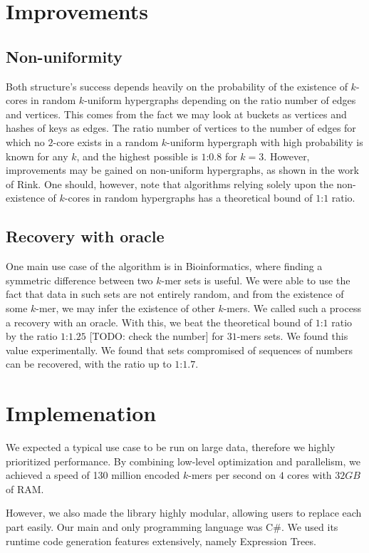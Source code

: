 \section*{Improvements}

\subsection*{Non-uniformity}
Both structure's success depends heavily on the probability of the existence of $k$-cores in random $k$-uniform hypergraphs depending on the ratio number of edges and vertices. This comes from the fact we may look at buckets as vertices 
and hashes of keys as edges. The ratio number of vertices to the number of edges for which no $2$-core exists
 in a random $k$-uniform hypergraph with high probability is known for any $k$, and the highest possible is $1$:$0.8$ for $k = 3$.\cite{DBLP:conf/soda/Molloy04}
However, improvements may be gained on non-uniform hypergraphs, as shown in the work of Rink\cite{DBLP:journals/corr/abs-1204-2131}. One should, however, note that algorithms relying solely upon 
the non-existence of $k$-cores in random hypergraphs has a theoretical bound of $1$:$1$ ratio.

\subsection*{Recovery with oracle}
One main use case of the algorithm is in Bioinformatics, where finding a symmetric difference between two $k$-mer sets is useful. 
We were able to use the fact that data in such sets are not entirely random, and from the existence of some $k$-mer, we may infer the existence of other $k$-mers. We called such a process a recovery with 
an oracle. With this, we beat the theoretical bound of $1$:$1$ ratio by the ratio $1$:$1.25$ [TODO: check the number] for $31$-mers sets. We found this value experimentally.
We found that sets compromised of sequences of numbers can be recovered, with the ratio up to $1$:$1.7$.

\section*{Implemenation}
We expected a typical use case to be run on large data, therefore we highly prioritized performance. By combining low-level optimization and parallelism, we achieved a speed of 130 million encoded $k$-mers per second on $4$ cores with $32GB$ of RAM. 

However, we also made the library highly modular, allowing users to replace each part easily. Our main and only programming language was C\#. We used its runtime code generation features extensively, namely Expression Trees. 

